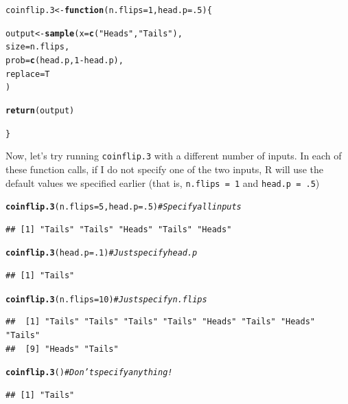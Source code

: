 \documentclass{tufte-book}\usepackage[]{graphicx}\usepackage[]{color}
\makeatletter
\newcommand{\hlnum}[1]{\textcolor[rgb]{0.686,0.059,0.569}{#1}}%
\newcommand{\hlstr}[1]{\textcolor[rgb]{0.192,0.494,0.8}{#1}}%
\newcommand{\hlcom}[1]{\textcolor[rgb]{0.678,0.584,0.686}{\textit{#1}}}%
\newcommand{\hlopt}[1]{\textcolor[rgb]{0,0,0}{#1}}%
\newcommand{\hlstd}[1]{\textcolor[rgb]{0.345,0.345,0.345}{#1}}%
\newcommand{\hlkwa}[1]{\textcolor[rgb]{0.161,0.373,0.58}{\textbf{#1}}}%
\newcommand{\hlkwb}[1]{\textcolor[rgb]{0.69,0.353,0.396}{#1}}%
\newcommand{\hlkwc}[1]{\textcolor[rgb]{0.333,0.667,0.333}{#1}}%
\newcommand{\hlkwd}[1]{\textcolor[rgb]{0.737,0.353,0.396}{\textbf{#1}}}%
\newenvironment{kframe}{%
 \def\at@end@of@kframe{}%
 \ifinner\ifhmode%
  \def\at@end@of@kframe{\end{minipage}}%
  \begin{minipage}{\columnwidth}%
 \fi\fi%
 \def\FrameCommand##1{\hskip\@totalleftmargin \hskip-\fboxsep
 \colorbox{shadecolor}{##1}\hskip-\fboxsep
     \hskip-\linewidth \hskip-\@totalleftmargin \hskip\columnwidth}%
 \MakeFramed {\advance\hsize-\width
   \@totalleftmargin\z@ \linewidth\hsize
   \@setminipage}}%
 {\par\unskip\endMakeFramed%
 \at@end@of@kframe}
\newenvironment{knitrout}{}{} %
\makeatother
\begin{document}
\begin{footnotesize}
\begin{knitrout}
\color{fgcolor}\begin{kframe}
\begin{alltt}
\hlstd{coinflip.3} \hlkwb{<-} \hlkwa{function} \hlstd{(}\hlkwc{n.flips} \hlstd{=} \hlnum{1}\hlstd{,} \hlkwc{head.p} \hlstd{=} \hlnum{.5}\hlstd{) \{}

  \hlstd{output} \hlkwb{<-} \hlkwd{sample}\hlstd{(}\hlkwc{x} \hlstd{=} \hlkwd{c}\hlstd{(}\hlstr{"Heads"}\hlstd{,} \hlstr{"Tails"}\hlstd{),}
                   \hlkwc{size} \hlstd{= n.flips,}
                   \hlkwc{prob} \hlstd{=} \hlkwd{c}\hlstd{(head.p,} \hlnum{1} \hlopt{-} \hlstd{head.p),}
                   \hlkwc{replace} \hlstd{= T}
                   \hlstd{)}

  \hlkwd{return}\hlstd{(output)}

\hlstd{\}}
\end{alltt}
\end{kframe}
\end{knitrout}

Now, let's try running \texttt{coinflip.3} with a different number of inputs. In each of these function calls, if I do not specify one of the two inputs, R will use the default values we specified earlier (that is, \texttt{n.flips = 1} and \texttt{head.p = .5})

\begin{knitrout}
\color{fgcolor}\begin{kframe}
\begin{alltt}
\hlkwd{coinflip.3}\hlstd{(}\hlkwc{n.flips} \hlstd{=} \hlnum{5}\hlstd{,} \hlkwc{head.p} \hlstd{=} \hlnum{.5}\hlstd{)}  \hlcom{# Specify all inputs}
\end{alltt}
\begin{verbatim}
## [1] "Tails" "Tails" "Heads" "Tails" "Heads"
\end{verbatim}
\begin{alltt}
\hlkwd{coinflip.3}\hlstd{(}\hlkwc{head.p} \hlstd{=} \hlnum{.1}\hlstd{)}  \hlcom{# Just specify head.p}
\end{alltt}
\begin{verbatim}
## [1] "Tails"
\end{verbatim}
\begin{alltt}
\hlkwd{coinflip.3}\hlstd{(}\hlkwc{n.flips} \hlstd{=} \hlnum{10}\hlstd{)} \hlcom{# Just specify n.flips}
\end{alltt}
\begin{verbatim}
##  [1] "Tails" "Tails" "Tails" "Tails" "Heads" "Tails" "Heads" "Tails"
##  [9] "Heads" "Tails"
\end{verbatim}
\begin{alltt}
\hlkwd{coinflip.3}\hlstd{()}  \hlcom{# Don't specify anything!}
\end{alltt}
\begin{verbatim}
## [1] "Tails"
\end{verbatim}
\end{kframe}
\end{knitrout}


\end{footnotesize}
\end{document}
